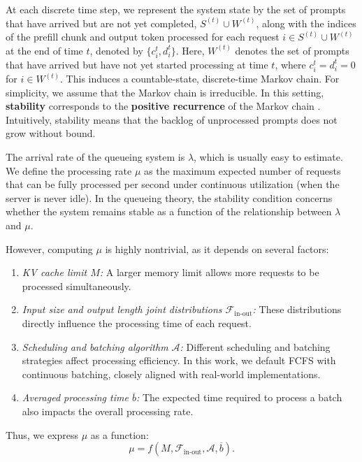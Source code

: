 \documentclass{article}
\newcommand{\xhdr}[1]{\vspace{1mm} \noindent{\bf #1}}
\theoremstyle{plain}
\theoremstyle{definition}
\theoremstyle{remark}
\begin{document}
\xhdr{System Stability.} At each discrete time step, we represent the system state by the set of prompts that have arrived but are not yet completed, $S^{(t)} \cup W^{(t)}$, along with the indices of the prefill chunk and output token processed for each request $i \in S^{(t)} \cup W^{(t)}$ at the end of time $t$, denoted by $\{c_i^{t}, d_i^{t}\}$. Here, \(W^{(t)}\) denotes the set of prompts 
that have arrived but have not yet started processing at time \(t\), where $c_i^{t}=d_i^{t}=0$ for $i\in W^{(t)}$.
This induces a countable-state, discrete-time Markov chain. For simplicity, we assume that the Markov chain is irreducible. In this setting, \textbf{stability} corresponds to the \textbf{positive recurrence} of the Markov chain \citep{dai2020processing, bramson2008stability}. Intuitively, stability means that the backlog of unprocessed prompts does not grow without bound.

\xhdr{Stability Condition.} The arrival rate of the queueing system is  $\lambda$, which is usually easy to estimate. We define the processing rate $\mu$ as the maximum  expected number of requests that can be fully processed per second under continuous utilization (when the server is never idle). In the queueing theory, the stability condition concerns whether the system remains stable as a function of the relationship between $\lambda$ and $\mu$.

However, computing \( \mu \) is highly nontrivial, as it depends on several factors:  
\begin{enumerate}
    \item \textit{KV cache limit $M$: } A larger memory limit allows more requests to be processed simultaneously.  
    \item \textit{Input size and output length joint distributions $\mathcal F_{\text{in-out}}$: } These distributions directly influence the processing time of each request. 
    \item \textit{Scheduling and batching algorithm $\mathcal A$: } Different scheduling and batching strategies affect processing efficiency. In this work, we default FCFS with continuous batching, closely aligned with real-world implementations.
    \item \textit{Averaged processing time $\overline{b}$: } The expected time required to process a batch also impacts the overall processing rate.  
\end{enumerate}

Thus, we express \( \mu \) as a function:  
\[
\mu = f(M, \mathcal{F}_{\text{in-out}}, \mathcal{A}, \overline{b}).
\]  
\end{document}
